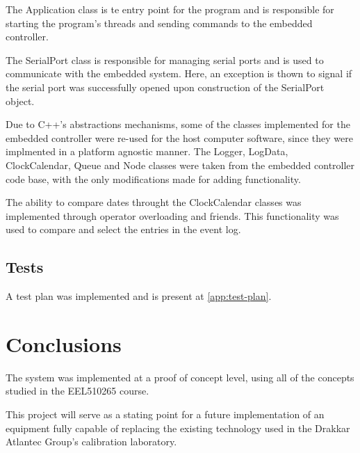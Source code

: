 \documentclass[10pt,twocolumn,letterpaper]{article}
\begin{document}
The Application class is te entry point for the program and is responsible for starting the program's threads and sending commands to the embedded controller.

The SerialPort class is responsible for managing serial ports and is used to communicate with the embedded system. Here, an exception is thown to signal if the serial port was successfully opened upon construction of the SerialPort object.

Due to C++'s abstractions mechanisms, some of the classes implemented for the embedded controller were re-used for the host computer software, since they were implmented in a platform agnostic manner.
The Logger, LogData, ClockCalendar, Queue and Node classes were taken from the embedded controller code base, with the only modifications made for adding functionality.

The ability to compare dates throught the ClockCalendar classes was implemented through operator overloading and friends. This functionality was used to compare and select the entries in the event log.


\subsection{Tests}

A test plan was implemented and is present at \autoref{app:test-plan}.

\section*{Conclusions}

The system was implemented at a proof of concept level, using all of the concepts studied in the EEL510265 course.

This project will serve as a stating point for a future implementation of an equipment fully capable of replacing the existing technology used in the Drakkar Atlantec Group's calibration laboratory.
\end{document}
